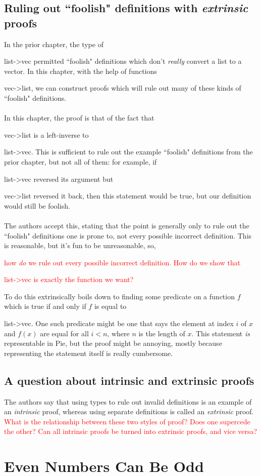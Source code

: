 \documentclass{article}
\newcommand*{\SavedLstInline}{}
\DeclareRobustCommand*{\lstinline}{%
  \ifmmode
    \let\SavedBGroup\bgroup
    \def\bgroup{%
      \let\bgroup\SavedBGroup
      \hbox\bgroup
    }%
  \fi
  \SavedLstInline
}
\begin{document}
\subsection{Ruling out ``foolish" definitions with \textit{extrinsic} proofs}
In the prior chapter, the type of \lstinline{list->vec} permitted ``foolish" definitions which don't \textit{really} convert a list to a vector. In this chapter, with the help of functions \lstinline{vec->list}, we can construct proofs which will rule out many of these kinds of ``foolish" definitions.
\\ \\
In this chapter, the proof is that of the fact that \lstinline{vec->list} is a left-inverse to \lstinline{list->vec}. This is sufficient to rule out the example ``foolish" definitions from the prior chapter, but not all of them: for example, if \lstinline{list->vec} reversed its argument but \lstinline{vec->list} reversed it back, then this statement would be true, but our definition would still be foolish.
\\ \\
The authors accept this, stating that the point is generally only to rule out the ``foolish" definitions one is prone to, not every possible incorrect definition. This is reasonable, but it's fun to be unreasonable, so, \textcolor{red}{how \textit{do} we rule out every possible incorrect definition. How do we show that \lstinline{list->vec} is exactly the function we want?} To do this extrinsically boils down to finding some predicate on a function \(f\) which is true if and only if \(f\) is equal to \lstinline{list->vec}. One such predicate might be one that says the element at index \(i\) of \(x\) and \(f(x)\) are equal for all \(i < n\), where \(n\) is the length of \(x\). This statement \textit{is} representable in Pie, but the proof might be annoying, mostly because representing the statement itself is really cumbersome.
\subsection{A question about intrinsic and extrinsic proofs}
The authors say that using types to rule out invalid definitions is an example of an \textit{intrinsic} proof, whereas using separate definitions is called an \textit{extrinsic} proof. \textcolor{red}{What is the relationship between these two styles of proof? Does one supercede the other? Can all intrinsic proofs be turned into extrinsic proofs, and vice versa?}
\section{Even Numbers Can Be Odd}
\end{document}
